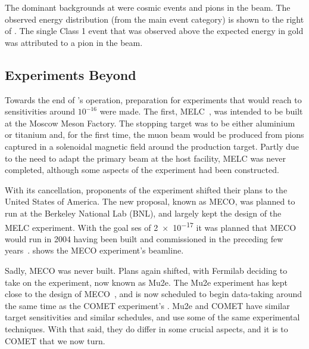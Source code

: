 The dominant backgrounds at \sindrumII were cosmic events and pions in the beam.  
The observed energy distribution (from the main event category) is shown to the right of .  
The single Class 1 event that was observed above the expected \mueconv energy in gold was attributed to a pion in the beam.

\subsection{Experiments Beyond \sindrumII}
\FigMuecMECO
Towards the end of \sindrumII's operation, preparation for experiments that would reach to sensitivities around $10^{-16}$ were made.
The first, MELC~\cite{MELC}, was intended to be built at the Moscow Meson Factory.
The stopping target was to be either aluminium or titanium and, for the first time, the muon beam would be produced from pions captured in a solenoidal magnetic field around the production target.
Partly due to the need to adapt the primary beam at the host facility, MELC was never completed, although some aspects of the experiment had been constructed.

With its cancellation, proponents of the experiment shifted their plans to the United States of America.  
The new proposal, known as MECO, was planned to run at the Berkeley National Lab (BNL), and largely kept the design of the MELC experiment.
With the goal \ac{ses} of \num{2e-17} it was planned that MECO would run in 2004 having been built and commissioned in the preceding few years~\cite{MECO}.
 shows the MECO experiment's beamline.

Sadly, MECO was never built.  
Plans again shifted, with Fermilab deciding to take on the experiment, now known as Mu2e.
The Mu2e experiment has kept close to the design of MECO~\cite{Mu2e2014}, and is now scheduled to begin data-taking around the same time as the COMET experiment's \phaseII.
Mu2e and COMET have similar target sensitivities and similar schedules, and use some of the same experimental techniques.
With that said, they do differ in some crucial aspects, and it is to COMET that we now turn.
